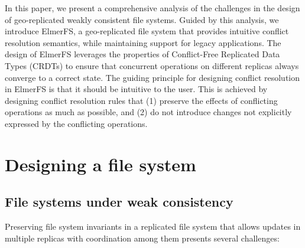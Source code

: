 \documentclass[sigconf, anonymous, 10pt]{acmart}
\begin{document}
In this paper, we present a comprehensive analysis of the challenges in
the design of geo-replicated weakly consistent file systems.
Guided by this analysis, we introduce ElmerFS,
a geo-replicated file system that provides intuitive conflict resolution
semantics, while maintaining support for legacy applications.
The design of ElmerFS leverages the properties of Conflict-Free Replicated Data
Types (CRDTs) to ensure that concurrent operations on different replicas always
converge to a correct state.
The guiding principle for designing conflict resolution in ElmerFS is that
it should be intuitive to the user.
This is achieved by designing conflict resolution rules that
(1) preserve the effects of conflicting operations as much as possible,
and (2) do not introduce changes not explicitly expressed by the conflicting
operations.

\section{Designing a file system}

\subsection{File systems under weak consistency}
\label{fs:weak}

Preserving file system invariants in a replicated file system
that allows updates in multiple replicas with coordination
among them presents several challenges:
\end{document}
